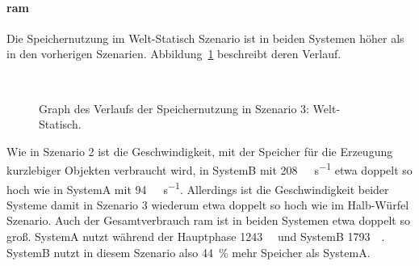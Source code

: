 \paragraph{\ac{ram}}
Die Speichernutzung im Welt-Statisch Szenario ist in beiden Systemen höher als in den vorherigen Szenarien. Abbildung~\ref{fig:seed-0-static-mem} beschreibt deren Verlauf. 
\begin{figure}[!htbp]
	\\
	\caption{Graph des Verlaufs der Speichernutzung in Szenario 3: Welt-Statisch.}\label{fig:seed-0-static-mem}
\end{figure} 
Wie in Szenario 2 ist die Geschwindigkeit, mit der Speicher für die Erzeugung kurzlebiger Objekten verbraucht wird, in SystemB mit \SI{208}{\mega\byte\per\second} etwa doppelt so hoch wie in SystemA mit \SI{94}{\mega\byte\per\second}. Allerdings ist die Geschwindigkeit beider Systeme damit in Szenario 3 wiederum etwa doppelt so hoch wie im Halb-Würfel Szenario.
Auch der Gesamtverbrauch \ac{ram} ist in beiden Systemen etwa doppelt so groß. SystemA nutzt während der Hauptphase \SI{1243}{\mega\byte} und SystemB \SI{1793}{\mega\byte}. SystemB nutzt in diesem Szenario also \SI{44}{\percent} mehr Speicher als SystemA.   